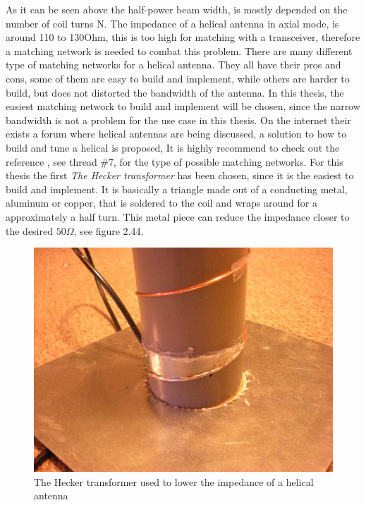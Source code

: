 As it can be seen above the half-power beam width, is mostly depended on the number of coil turns N. The impedance of a helical antenna in axial mode, is around 110 to 130Ohm, this is too high for matching with a transceiver, therefore a matching network is needed to combat this problem. There are many different type of matching networks for a helical antenna. They all have their pros and cons, some of them are easy to build and implement, while others are harder to build, but does not distorted the bandwidth of the antenna. In this thesis, the easiest matching network to build and implement will be chosen, since the narrow bandwidth is not a problem for the use case in this thesis. On the internet their exists a forum where helical antennas are being discussed, a solution to how to build and tune a helical is proposed, It is highly recommend to check out the reference \cite{RCGroups}, see thread \#7, for the type of possible matching networks. For this thesis the first \textit{The Hecker transformer} has been chosen, since it is the easiest to build and implement. It is basically a triangle made out of a conducting metal, aluminum or copper, that is soldered to the coil and wraps around for a approximately a half turn. This metal piece can reduce the impedance closer to the desired $50\Omega$, see figure 2.44.  

\begin{figure}[h]
\centering
\includegraphics[scale=0.8]{figures/FormerHelical.jpg}
\caption{The Hecker transformer used to lower the impedance of a helical antenna}
\end{figure}

